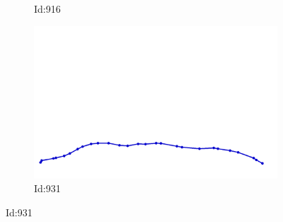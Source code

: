 \documentclass[12pt,twoside]{report}
\begin{document}
\begin{figure}
\begin{subfigure}[b]{0.20\textwidth}
\caption{Id:916}
\end{subfigure}
\begin{subfigure}[b]{0.20\textwidth}
\centering
\includegraphics[width=\textwidth]{../trajectories/931.png}
\caption{Id:931}
\end{subfigure}
\end{figure}
\end{document}
